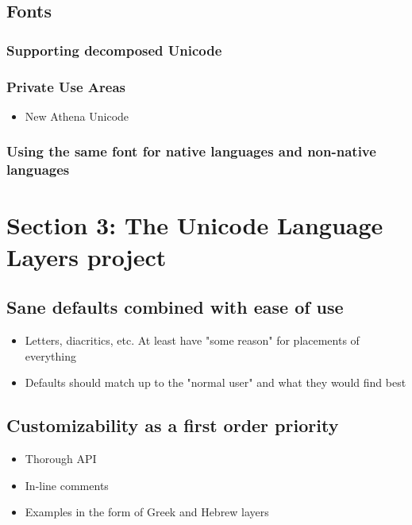 \documentclass[11pt]{article}
\begin{document}
\subsection{Fonts}
\label{sec:org41a0656}

\subsubsection{Supporting decomposed Unicode}
\label{sec:org8a8cc11}

\subsubsection{Private Use Areas}
\label{sec:org300da1b}

\begin{itemize}
\item New Athena Unicode
\end{itemize}

\subsubsection{Using the same font for native languages and non-native languages}
\label{sec:org747ea27}

\section{Section 3: The Unicode Language Layers project}
\label{sec:orga340198}

\subsection{Sane defaults combined with ease of use}
\label{sec:org9d4c351}

\begin{itemize}
\item Letters, diacritics, etc. At least have "some reason" for placements of everything
\item Defaults should match up to the "normal user" and what they would find best
\end{itemize}

\subsection{Customizability as a first order priority}
\label{sec:orgec2e0cf}

\begin{itemize}
\item Thorough API
\item In-line comments
\item Examples in the form of Greek and Hebrew layers
\end{itemize}
\end{document}
